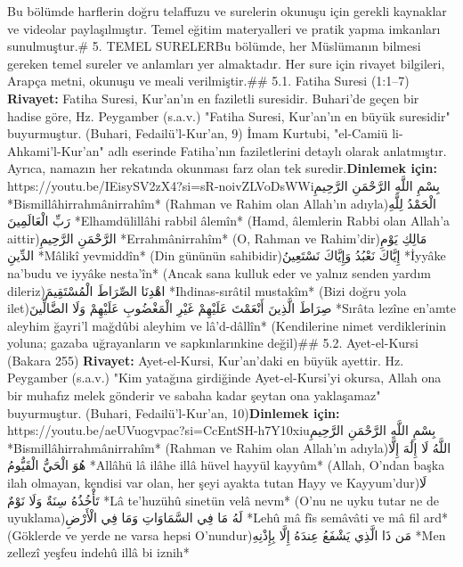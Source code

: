 \documentclass[12pt,a4paper]{article}
\begin{document}
Bu bölümde harflerin doğru telaffuzu ve surelerin okunuşu için gerekli kaynaklar ve videolar paylaşılmıştır. Temel eğitim materyalleri ve pratik yapma imkanları sunulmuştur.\# 5. TEMEL SURELERBu bölümde, her Müslümanın bilmesi gereken temel sureler ve anlamları yer almaktadır. Her sure için rivayet bilgileri, Arapça metni, okunuşu ve meali verilmiştir.\#\# 5.1. Fatiha Suresi (1:1–7)
\textbf{Rivayet:} Fatiha Suresi, Kur'an'ın en faziletli suresidir. Buhari'de geçen bir hadise göre, Hz. Peygamber (s.a.v.) "Fatiha Suresi, Kur'an'ın en büyük suresidir" buyurmuştur. (Buhari, Fedailü'l-Kur'an, 9) İmam Kurtubi, "el-Camiü li-Ahkami'l-Kur'an" adlı eserinde Fatiha'nın faziletlerini detaylı olarak anlatmıştır. Ayrıca, namazın her rekatında okunması farz olan tek suredir.\textbf{Dinlemek için:} https://youtu.be/IEisySV2zX4?si=sR-noivZLVoDsWWiبِسْمِ اللَّهِ الرَّحْمَنِ الرَّحِيمِ
*Bismillâhirrahmânirrahîm*
(Rahman ve Rahim olan Allah'ın adıyla)الْحَمْدُ لِلَّهِ رَبِّ الْعَالَمِينَ
*Elhamdülillâhi rabbil âlemîn*
(Hamd, âlemlerin Rabbi olan Allah'a aittir)الرَّحْمَنِ الرَّحِيمِ
*Errahmânirrahîm*
(O, Rahman ve Rahim'dir)مَالِكِ يَوْمِ الدِّينِ
*Mâlikî yevmiddîn*
(Din gününün sahibidir)إِيَّاكَ نَعْبُدُ وَإِيَّاكَ نَسْتَعِينُ
*İyyâke na'budu ve iyyâke nesta'în*
(Ancak sana kulluk eder ve yalnız senden yardım dileriz)اهْدِنَا الصِّرَاطَ الْمُسْتَقِيمَ
*Ihdinas-sırâtil mustakîm*
(Bizi doğru yola ilet)صِرَاطَ الَّذِينَ أَنْعَمْتَ عَلَيْهِمْ غَيْرِ الْمَغْضُوبِ عَلَيْهِمْ وَلَا الضَّالِّينَ
*Sırâta lezîne en'amte aleyhim ğayri'l mağdûbi aleyhim ve lâ'd-dâllîn*
(Kendilerine nimet verdiklerinin yoluna; gazaba uğrayanların ve sapkınlarınkine değil)\#\# 5.2. Ayet-el-Kursi (Bakara 255)
\textbf{Rivayet:} Ayet-el-Kursi, Kur'an'daki en büyük ayettir. Hz. Peygamber (s.a.v.) "Kim yatağına girdiğinde Ayet-el-Kursi'yi okursa, Allah ona bir muhafız melek gönderir ve sabaha kadar şeytan ona yaklaşamaz" buyurmuştur. (Buhari, Fedailü'l-Kur'an, 10)\textbf{Dinlemek için:} https://youtu.be/aeUVuogvpac?si=CcEntSH-h7Y10xiuبِسْمِ اللَّهِ الرَّحْمَنِ الرَّحِيمِ
*Bismillâhirrahmânirrahîm*
(Rahman ve Rahim olan Allah'ın adıyla)اللَّهُ لَا إِلَٰهَ إِلَّا هُوَ الْحَيُّ الْقَيُّومُ
*Allâhü lâ ilâhe illâ hüvel hayyül kayyûm*
(Allah, O'ndan başka ilah olmayan, kendisi var olan, her şeyi ayakta tutan Hayy ve Kayyum'dur)لَا تَأْخُذُهُ سِنَةٌ وَلَا نَوْمٌ
*Lâ te'huzühû sinetün velâ nevm*
(O'nu ne uyku tutar ne de uyuklama)لَهُ مَا فِي السَّمَاوَاتِ وَمَا فِي الْأَرْضِ
*Lehû mâ fîs semâvâti ve mâ fil ard*
(Göklerde ve yerde ne varsa hepsi O'nundur)مَن ذَا الَّذِي يَشْفَعُ عِندَهُ إِلَّا بِإِذْنِهِ
*Men zellezî yeşfeu indehû illâ bi iznih*
\end{document}
